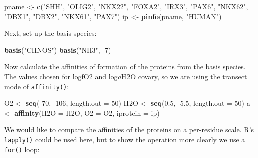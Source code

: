 \documentclass[]{tufte-handout}
\newenvironment{Shaded}{}{}
\newcommand{\KeywordTok}[1]{\textcolor[rgb]{0.00,0.44,0.13}{\textbf{#1}}}
\newcommand{\DataTypeTok}[1]{\textcolor[rgb]{0.56,0.13,0.00}{#1}}
\newcommand{\DecValTok}[1]{\textcolor[rgb]{0.25,0.63,0.44}{#1}}
\newcommand{\FloatTok}[1]{\textcolor[rgb]{0.25,0.63,0.44}{#1}}
\newcommand{\StringTok}[1]{\textcolor[rgb]{0.25,0.44,0.63}{#1}}
\newcommand{\OperatorTok}[1]{\textcolor[rgb]{0.40,0.40,0.40}{#1}}
\newcommand{\NormalTok}[1]{#1}
\begin{document}
\begin{Shaded}
\begin{Highlighting}[]
\NormalTok{pname <-}\StringTok{ }\KeywordTok{c}\NormalTok{(}\StringTok{"SHH"}\NormalTok{, }\StringTok{"OLIG2"}\NormalTok{, }\StringTok{"NKX22"}\NormalTok{, }\StringTok{"FOXA2"}\NormalTok{, }\StringTok{"IRX3"}\NormalTok{,}
  \StringTok{"PAX6"}\NormalTok{, }\StringTok{"NKX62"}\NormalTok{, }\StringTok{"DBX1"}\NormalTok{, }\StringTok{"DBX2"}\NormalTok{, }\StringTok{"NKX61"}\NormalTok{, }\StringTok{"PAX7"}\NormalTok{)}
\NormalTok{ip <-}\StringTok{ }\KeywordTok{pinfo}\NormalTok{(pname, }\StringTok{"HUMAN"}\NormalTok{)}
\end{Highlighting}
\end{Shaded}

Next, set up the basis species:

\begin{Shaded}
\begin{Highlighting}[]
\KeywordTok{basis}\NormalTok{(}\StringTok{"CHNOS"}\NormalTok{)}
\KeywordTok{basis}\NormalTok{(}\StringTok{"NH3"}\NormalTok{, }\OperatorTok{-}\DecValTok{7}\NormalTok{)}
\end{Highlighting}
\end{Shaded}

Now calculate the affinities of formation of the proteins from the basis
species. The values chosen for logfO2 and log\emph{a}H2O covary, so we
are using the transect mode of {\texttt{affinity()}}:

\begin{Shaded}
\begin{Highlighting}[]
\NormalTok{O2 <-}\StringTok{ }\KeywordTok{seq}\NormalTok{(}\OperatorTok{-}\DecValTok{70}\NormalTok{, }\OperatorTok{-}\DecValTok{106}\NormalTok{, }\DataTypeTok{length.out =} \DecValTok{50}\NormalTok{)}
\NormalTok{H2O <-}\StringTok{ }\KeywordTok{seq}\NormalTok{(}\FloatTok{0.5}\NormalTok{, }\OperatorTok{-}\FloatTok{5.5}\NormalTok{, }\DataTypeTok{length.out =} \DecValTok{50}\NormalTok{)}
\NormalTok{a <-}\StringTok{ }\KeywordTok{affinity}\NormalTok{(}\DataTypeTok{H2O =}\NormalTok{ H2O, }\DataTypeTok{O2 =}\NormalTok{ O2, }\DataTypeTok{iprotein =}\NormalTok{ ip)}
\end{Highlighting}
\end{Shaded}

We would like to compare the affinities of the proteins on a per-residue
scale. R's \texttt{lapply()} could be used here, but to show the
operation more clearly we use a \texttt{for()} loop:
\end{document}
